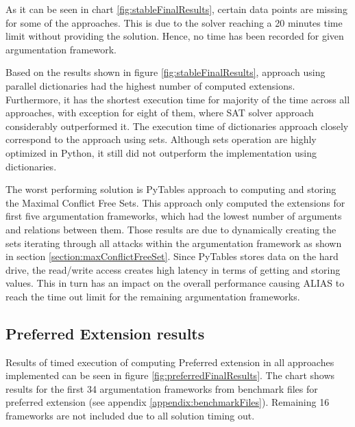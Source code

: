 As it can be seen in chart \ref{fig:stableFinalResults}, certain data points are missing for some of the approaches. This is due to the solver reaching a 20 minutes time limit without providing the solution. Hence, no time has been recorded for given argumentation framework.

Based on the results shown in figure \ref{fig:stableFinalResults}, approach using parallel dictionaries had the highest number of computed extensions. Furthermore, it has the shortest execution time for majority of the time across all approaches, with exception for eight of them, where SAT solver approach considerably outperformed it. The execution time of dictionaries approach closely correspond to the approach using sets. Although sets operation are highly optimized in Python, it still did not outperform the implementation using dictionaries.

The worst performing solution is PyTables approach to computing and storing the Maximal Conflict Free Sets. This approach only computed the extensions for first five argumentation frameworks, which had the lowest number of arguments and relations between them. Those results are due to dynamically creating the sets iterating through all attacks within the argumentation framework as shown in section \ref{section:maxConflictFreeSet}. Since PyTables stores data on the hard drive, the read/write access creates high latency in terms of getting and storing values. This in turn has an impact on the overall performance causing ALIAS to reach the time out limit for the remaining argumentation frameworks.


\subsection{Preferred Extension results} \label{section:preferredExtensionResults}
Results of timed execution of computing Preferred extension in all approaches implemented can be seen in figure \ref{fig:preferredFinalResults}. The chart shows results for the first 34 argumentation frameworks from benchmark files for preferred extension (see appendix \ref{appendix:benchmarkFiles}). Remaining 16 frameworks are not included due to all solution timing out.

